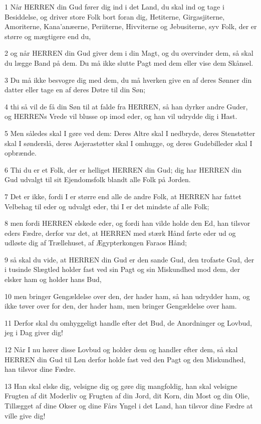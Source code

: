 \par 1 Når HERREN din Gud fører dig ind i det Land, du skal ind og tage i Besiddelse, og driver store Folk bort foran dig, Hetiterne, Girgasjiterne, Amoriterne, Kana'anæerne, Periiterne, Hivviterne og Jebusiterne, syv Folk, der er større og mægtigere end du,
\par 2 og når HERREN din Gud giver dem i din Magt, og du overvinder dem, så skal du lægge Band på dem. Du må ikke slutte Pagt med dem eller vise dem Skånsel.
\par 3 Du må ikke besvogre dig med dem, du må hverken give en af deres Sønner din datter eller tage en af deres Døtre til din Søn;
\par 4 thi så vil de få din Søn til at falde fra HERREN, så han dyrker andre Guder, og HERRENs Vrede vil blusse op imod eder, og han vil udrydde dig i Hast.
\par 5 Men således skal I gøre ved dem: Deres Altre skal I nedbryde, deres Stenstøtter skal I sønderslå, deres Asjerastøtter skal I omhugge, og deres Gudebilleder skal I opbrænde.
\par 6 Thi du er et Folk, der er helliget HERREN din Gud; dig har HERREN din Gud udvalgt til sit Ejendomsfolk blandt alle Folk på Jorden.
\par 7 Det er ikke, fordi I er større end alle de andre Folk, at HERREN har fattet Velbehag til eder og udvalgt eder, thi I er det mindste af alle Folk;
\par 8 men fordi HERREN elskede eder, og fordi han vilde holde den Ed, han tilsvor eders Fædre, derfor var det, at HERREN med stærk Hånd førte eder ud og udløste dig af Trællehuset, af Ægypterkongen Faraos Hånd;
\par 9 så skal du vide, at HERREN din Gud er den sande Gud, den trofaste Gud, der i tusinde Slægtled holder fast ved sin Pagt og sin Miskundhed mod dem, der elsker ham og holder hans Bud,
\par 10 men bringer Gengældelse over den, der hader ham, så han udrydder ham, og ikke tøver over for den, der hader ham, men bringer Gengældelse over ham.
\par 11 Derfor skal du omhyggeligt handle efter det Bud, de Anordninger og Lovbud, jeg i Dag giver dig!
\par 12 Når I nu hører disse Lovbud og holder dem og handler efter dem, så skal HERREN din Gud til Løn derfor holde fast ved den Pagt og den Miskundhed, han tilsvor dine Fædre.
\par 13 Han skal elske dig, velsigne dig og gøre dig mangfoldig, han skal velsigne Frugten af dit Moderliv og Frugten af din Jord, dit Korn, din Most og din Olie, Tillægget af dine Okser og dine Fårs Yngel i det Land, han tilsvor dine Fædre at ville give dig!
